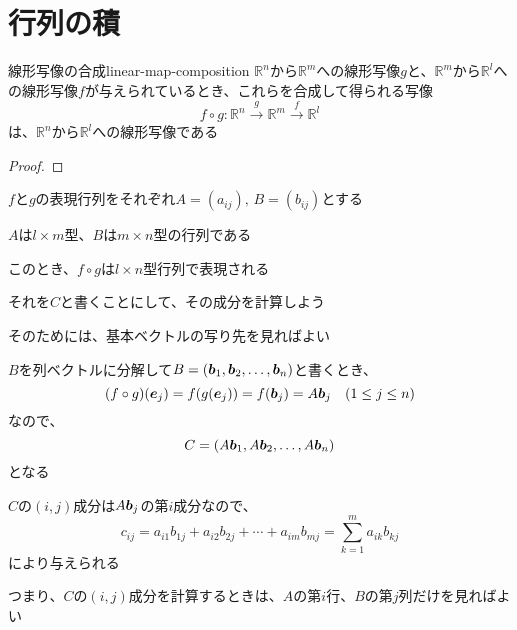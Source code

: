 \documentclass[../../../topic_linear-algebra]{subfiles}
\begin{document}
\sectionline
\section{行列の積}

\begin{theorem}{線形写像の合成}{linear-map-composition}
  $\mathbb{R}^n$から$\mathbb{R}^m$への線形写像$g$と、$\mathbb{R}^m$から$\mathbb{R}^l$への線形写像$f$が与えられているとき、これらを合成して得られる写像
  \begin{equation*}
    f \circ g\colon \mathbb{R}^n \xrightarrow{g} \mathbb{R}^m \xrightarrow{f} \mathbb{R}^l
  \end{equation*}
  は、$\mathbb{R}^n$から$\mathbb{R}^l$への線形写像である
\end{theorem}

\begin{proof}
\end{proof}

$f$と$g$の表現行列をそれぞれ$A = (a_{ij}), \, B = (b_{ij})$とする

$A$は$l \times m$型、$B$は$m \times n$型の行列である

\br

このとき、$f \circ g$は$l \times n$型行列で表現される

それを$C$と書くことにして、その成分を計算しよう

そのためには、基本ベクトルの写り先を見ればよい

\br

$B$を列ベクトルに分解して$B = (\vb*{b}_1, \vb*{b}_2, \dots, \vb*{b}_n)$と書くとき、
\begin{equation*}
  (f \circ g)(\vb*{e}_j) = f(g(\vb*{e}_j)) = f(\vb*{b}_j) = A \vb*{b}_j \quad (1 \leq j \leq n)
\end{equation*}
なので、
\begin{equation*}
  C = (A\vb*{b}_1, A\vb*{b}_2, \dots, A\vb*{b}_n)
\end{equation*}
となる

$C$の$(i, j)$成分は$A\vb*{b}_j$の第$i$成分なので、
\begin{equation*}
  c_{ij} = a_{i1} b_{1j} + a_{i2} b_{2j} + \cdots + a_{im} b_{mj} = \sum_{k=1}^m a_{ik} b_{kj}
\end{equation*}
により与えられる

つまり、$C$の$(i, j)$成分を計算するときは、$A$の第$i$行、$B$の第$j$列だけを見ればよい
\end{document}
